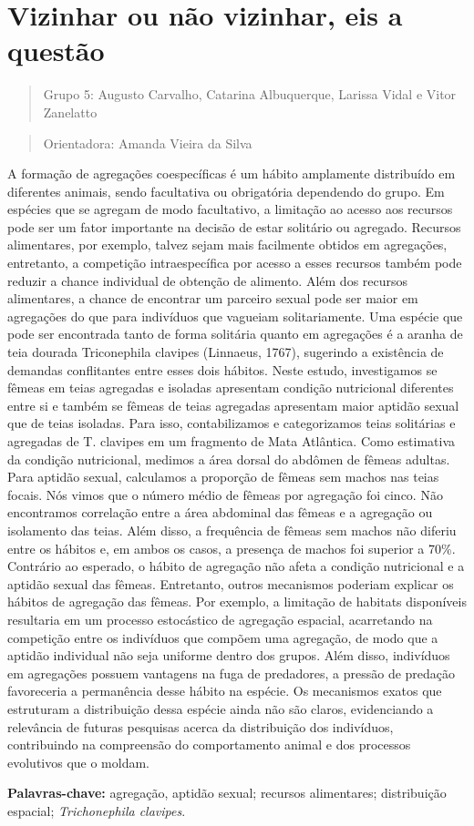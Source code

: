 \documentclass[
]{book}
\begin{document}
\chapter{Vizinhar ou não vizinhar, eis a questão}\label{vizinhar-ou-nuxe3o-vizinhar-eis-a-questuxe3o}

\begin{quote}
Grupo 5: Augusto Carvalho, Catarina Albuquerque, Larissa Vidal e Vitor Zanelatto
\end{quote}

\begin{quote}
Orientadora: Amanda Vieira da Silva
\end{quote}

A formação de agregações coespecíficas é um hábito amplamente distribuído em diferentes animais, sendo facultativa ou obrigatória dependendo do grupo. Em espécies que se agregam de modo facultativo, a limitação ao acesso aos recursos pode ser um fator importante na decisão de estar solitário ou agregado. Recursos alimentares, por exemplo, talvez sejam mais facilmente obtidos em agregações, entretanto, a competição intraespecífica por acesso a esses recursos também pode reduzir a chance individual de obtenção de alimento. Além dos recursos alimentares, a chance de encontrar um parceiro sexual pode ser maior em agregações do que para indivíduos que vagueiam solitariamente. Uma espécie que pode ser encontrada tanto de forma solitária quanto em agregações é a aranha de teia dourada Triconephila clavipes (Linnaeus, 1767), sugerindo a existência de demandas conflitantes entre esses dois hábitos. Neste estudo, investigamos se fêmeas em teias agregadas e isoladas apresentam condição nutricional diferentes entre si e também se fêmeas de teias agregadas apresentam maior aptidão sexual que de teias isoladas. Para isso, contabilizamos e categorizamos teias solitárias e agregadas de T. clavipes em um fragmento de Mata Atlântica. Como estimativa da condição nutricional, medimos a área dorsal do abdômen de fêmeas adultas. Para aptidão sexual, calculamos a proporção de fêmeas sem machos nas teias focais. Nós vimos que o número médio de fêmeas por agregação foi cinco. Não encontramos correlação entre a área abdominal das fêmeas e a agregação ou isolamento das teias. Além disso, a frequência de fêmeas sem machos não diferiu entre os hábitos e, em ambos os casos, a presença de machos foi superior a 70\%. Contrário ao esperado, o hábito de agregação não afeta a condição nutricional e a aptidão sexual das fêmeas. Entretanto, outros mecanismos poderiam explicar os hábitos de agregação das fêmeas. Por exemplo, a limitação de habitats disponíveis resultaria em um processo estocástico de agregação espacial, acarretando na competição entre os indivíduos que compõem uma agregação, de modo que a aptidão individual não seja uniforme dentro dos grupos. Além disso, indivíduos em agregações possuem vantagens na fuga de predadores, a pressão de predação favoreceria a permanência desse hábito na espécie. Os mecanismos exatos que estruturam a distribuição dessa espécie ainda não são claros, evidenciando a relevância de futuras pesquisas acerca da distribuição dos indivíduos, contribuindo na compreensão do comportamento animal e dos processos evolutivos que o moldam.

\textbf{Palavras-chave:} agregação, aptidão sexual; recursos alimentares; distribuição espacial; \emph{Trichonephila clavipes}.

  
\end{document}
